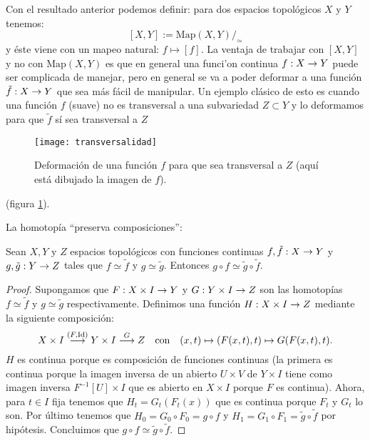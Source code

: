\documentclass[../../topologia_algebraica.tex]{subfiles}
\begin{document}
Con el resultado anterior podemos definir: para dos espacios topol\'ogicos $X$ y $Y$ tenemos:
\[
  [X,Y]:=\text{Map}(X,Y)/_{\simeq}
\]
y \'este viene con un mapeo natural: $f\mapsto[f]$. La ventaja de trabajar con $[X,Y]$ y no con
$\text{Map}(X,Y)$ es que en general una funci'on continua $f:X\rightarrow Y$ puede ser complicada de
manejar, pero en general se va a poder deformar a una funci\'on $\tilde{f}:X\rightarrow Y$ que sea m\'as
f\'acil de manipular. Un ejemplo cl\'asico de esto es cuando una funci\'on $f$ (suave) no es transversal
a una subvariedad $Z\subset Y$ y lo deformamos para que $\tilde{f}$ s\'i sea transversal a $Z$%
    \begin{figure}
      \caption{Deformaci\'on de una funci\'on $f$ para que sea transversal a $Z$ (aqu\'i est\'a
        dibujado la imagen de $f$).}
	\texttt{[image: transversalidad]}\centering
	\label{fig:transversalidad}
      \end{figure}
(figura \ref{fig:transversalidad}).

La homotop\'ia ``preserva composiciones'':

\begin{prop}\label{prop:homotopia_composicion}
  Sean $X,Y$ y $Z$ espacios topol\'ogicos con funciones continuas $f,\tilde{f}:X\rightarrow Y$ y
  $g,\tilde{g}:Y\rightarrow Z$ tales que $f\simeq \tilde{f}$ y $g\simeq\tilde{g}$. Entonces
  $g\circ f\simeq \tilde{g}\circ\tilde{f}$.
\end{prop}

\begin{proof}
  Supongamos que $F:X\times I\rightarrow Y$ y $G:Y\times I\rightarrow Z$ son las homotop\'ias $f\simeq\tilde{f}$
  y $g\simeq\tilde{g}$ respectivamente. Definimos una funci\'on $H:X\times I\rightarrow Z$ mediante la
  siguiente composici\'on:
  \[
    X\times I \overset{(F,\text{Id})}{\longrightarrow} Y\times I \overset{G}{\longrightarrow} Z \quad\text{con}\quad
    (x,t)\mapsto (F(x,t),t)\mapsto G(F(x,t),t). 
  \]
  $H$ es continua porque es composici\'on de funciones continuas (la primera es continua porque
  la imagen inversa de un abierto $U\times V$ de $Y\times I$ tiene como imagen inversa
  $F^{-1}[U]\times I$ que es abierto en $X\times I$ porque $F$ es continua). Ahora, para $t\in I$
  fija tenemos que $H_t=G_t(F_t(x))$ que es continua porque $F_t$ y $G_t$ lo son. Por \'ultimo
  tenemos que $H_0=G_0\circ F_0=g\circ f$ y $H_1=G_1\circ F_1=\tilde{g}\circ\tilde{f}$ por hip\'otesis.
  Concluimos que $g\circ f\simeq \tilde{g}\circ\tilde{f}$.
\end{proof}
\end{document}
